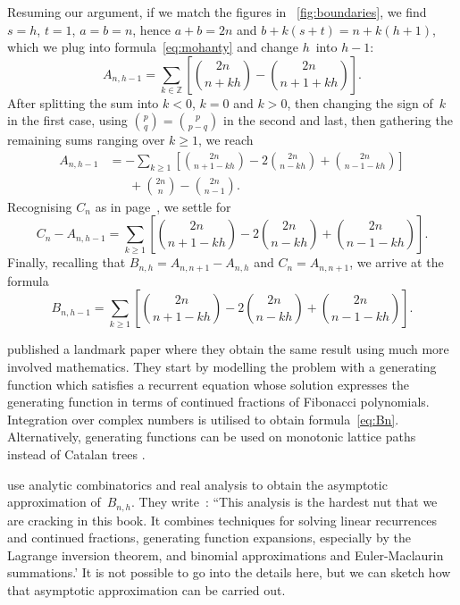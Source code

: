 Resuming our argument, if we match the figures in
\fig~\ref{fig:boundaries}, we find \(s=h\), \(t=1\), \(a=b=n\),
hence \(a+b=2n\) and \(b+k(s+t)=n+k(h+1)\),
which we plug into formula~\eqref{eq:mohanty} and change \(h\)~into \(h-1\):
\begin{equation*}
A_{n,h-1} = \sum_{k \in \mathbb{Z}}\left[\binom{2n}{n+kh} -
           \binom{2n}{n+1+kh}\right].
\end{equation*}
After splitting the sum into \(k<0\), \(k=0\) and \(k>0\), then
changing the sign of~\(k\) in the first case, using \(\binom{p}{q} =
\binom{p}{p-q}\) in the second and last, then gathering the remaining
sums ranging over \(k \geqslant 1\), we reach
\begin{align*}
A_{n,h-1}
  &= - \sum_{k \geqslant 1}\left[\binom{2n}{n+1-kh} -
    2\binom{2n}{n-kh} + \binom{2n}{n-1-kh}\right]\\
  &\phantom{=}\; + \binom{2n}{n} - \binom{2n}{n-1}.
\end{align*}
Recognising \(C_n\) as in page~\pageref{eq:Ann}, we settle for
\begin{equation*}
C_n - A_{n,h-1}
  = \sum_{k \geqslant 1}\left[\binom{2n}{n+1-kh} -
    2\binom{2n}{n-kh} + \binom{2n}{n-1-kh}\right].
\end{equation*}
Finally, recalling that \(B_{n,h} = A_{n,n+1} - A_{n,h}\) and \(C_n =
A_{n,n+1}\), we arrive at the formula
\begin{equation}
B_{n,h-1} = \sum_{k \geqslant 1}
            \left[\binom{2n}{n+1-kh} - 2\binom{2n}{n-kh}
            + \binom{2n}{n-1-kh}\right].
\label{eq:Bn}
\end{equation}

\citet*{KnuthdeBruijnRice_1972} published a landmark paper where they
obtain the same result using much more involved mathematics. They
start by modelling the problem with a generating function
\citep{Wilf_1990} which satisfies a recurrent equation whose solution
expresses the generating function in terms of continued fractions of
Fibonacci polynomials. Integration over complex numbers is utilised to
obtain formula~\eqref{eq:Bn}. Alternatively, generating functions can
be used on monotonic lattice paths instead of Catalan trees
\citep[page~64]{Kemp_1984} \citep{FlajoletNebelProdinger_2006}.

\citet*{SedgewickFlajolet_1996} \citep{FlajoletSedgewick_2009} use
analytic combinatorics and real analysis to obtain the asymptotic
approximation of~\(B_{n,h}\). They
write~\cite[p.~260]{SedgewickFlajolet_1996}: ``This analysis is the
hardest nut that we are cracking in this book. It combines techniques
for solving linear recurrences and continued fractions, generating
function expansions, especially by the Lagrange inversion theorem, and
binomial approximations and Euler\--Maclaurin summations.' It is not
possible to go into the details here, but we can sketch how that
asymptotic approximation can be carried out.

